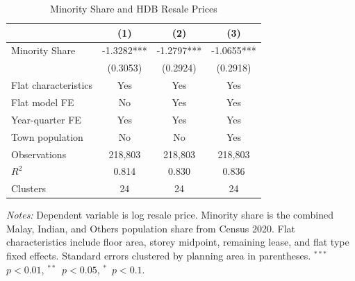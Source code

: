 \begin{table}[t]
\centering
\caption{Minority Share and HDB Resale Prices}
\label{tab:hedonic}
\begin{tabular}{lccc}
\hline\hline
 & (1) & (2) & (3) \\
\hline
Minority Share & -1.3282*** & -1.2797*** & -1.0655*** \\
 & (0.3053) & (0.2924) & (0.2918) \\
\hline
Flat characteristics & Yes & Yes & Yes \\
Flat model FE & No & Yes & Yes \\
Year-quarter FE & Yes & Yes & Yes \\
Town population & No & No & Yes \\
\hline
Observations & 218,803 & 218,803 & 218,803 \\
$R^2$ & 0.814 & 0.830 & 0.836 \\
Clusters & 24 & 24 & 24 \\
\hline\hline
\end{tabular}
\begin{tablenotes}[flushleft]\small
\item \textit{Notes:} Dependent variable is log resale price. Minority share is the combined Malay, Indian, and Others population share from Census 2020. Flat characteristics include floor area, storey midpoint, remaining lease, and flat type fixed effects. Standard errors clustered by planning area in parentheses. $^{***}$~$p<0.01$, $^{**}$~$p<0.05$, $^{*}$~$p<0.1$.
\end{tablenotes}
\end{table}

